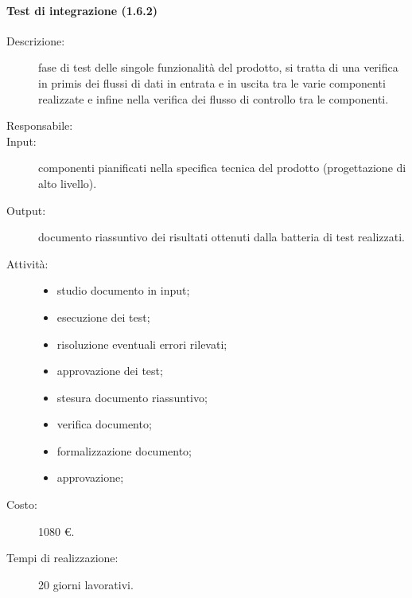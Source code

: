 \paragraph{Test di integrazione (1.6.2)}
\begin{description}
\item[Descrizione:] fase di test delle singole funzionalit\`{a} del prodotto, si tratta di una verifica in primis dei flussi di dati in entrata e in uscita tra le varie componenti realizzate e infine nella verifica dei flusso di controllo tra le componenti.
\item[Responsabile:] 
\item[Input:] componenti pianificati nella specifica tecnica del prodotto (progettazione di alto livello).
\item[Output:] documento riassuntivo dei risultati ottenuti dalla batteria di test realizzati.
\item[Attivit\`{a}:] 
\begin{center}
\begin{itemize}
\item studio documento in input;
\item esecuzione dei test;
\item risoluzione eventuali errori rilevati;
\item approvazione dei test;
\item stesura documento riassuntivo;
\item verifica documento;
\item formalizzazione documento;
\item approvazione;
\end{itemize}
\end{center}
\item[Costo:] 1080 \euro{}.
\item[Tempi di realizzazione:] 20 giorni lavorativi.
\end{description}

